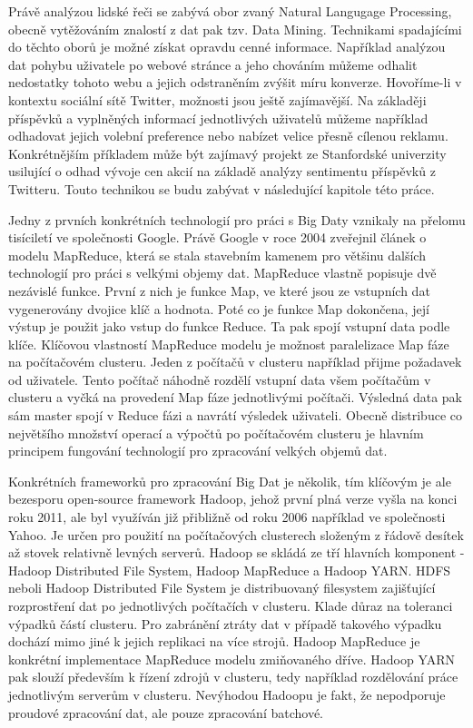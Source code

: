 \documentclass[thesis=B,czech]{FITthesis}[2012/06/26]
\begin{document}
 	Právě analýzou lidské řeči se zabývá obor zvaný Natural Langugage Processing, obecně vytěžováním znalostí z dat pak tzv. Data Mining. Technikami spadajícími do těchto oborů je možné získat opravdu cenné informace. Například analýzou dat pohybu uživatele po webové stránce a jeho chováním můžeme odhalit nedostatky tohoto webu a jejich odstraněním zvýšit míru konverze. Hovoříme-li v kontextu sociální sítě Twitter, možnosti jsou ještě zajímavější. Na základěji příspěvků a vyplněných informací jednotlivých uživatelů můžeme například odhadovat jejich volební preference nebo nabízet velice přesně cílenou reklamu. Konkrétnějším příkladem může být zajímavý projekt ze Stanfordské univerzity usilující o odhad vývoje cen akcií na základě analýzy sentimentu příspěvků z Twitteru\cite{stock-stanford}. Touto technikou se budu zabývat v následující kapitole této práce.  
	
	Jedny z prvních konkrétních technologií pro práci s Big Daty vznikaly na přelomu tisíciletí ve společnosti Google. Právě Google v roce 2004 zveřejnil článek o modelu MapReduce\cite{mapreduce-google}, která se stala stavebním kamenem pro většinu dalších technologií pro práci s velkými objemy dat. MapReduce vlastně popisuje dvě nezávislé funkce. První z nich je funkce Map, ve které jsou ze vstupních dat vygenerovány dvojice klíč a hodnota. Poté co je funkce Map dokončena, její výstup je použit jako vstup do funkce Reduce. Ta pak spojí vstupní data podle klíče\cite{mapreduce-description}. Klíčovou vlastností MapReduce modelu je možnost paralelizace Map fáze na počítačovém clusteru. Jeden z počítačů v clusteru například přijme požadavek od uživatele. Tento počítač náhodně rozdělí vstupní data všem počítačům v clusteru a vyčká na provedení Map fáze jednotlivými počítači. Výsledná data pak sám master spojí v Reduce fázi a navrátí výsledek uživateli. Obecně distribuce co největšího množství operací a výpočtů po počítačovém clusteru je hlavním principem fungování technologií pro zpracování velkých objemů dat. 
	
	Konkrétních frameworků pro zpracování Big Dat je několik, tím klíčovým je ale bezesporu open-source framework Hadoop, jehož první plná verze vyšla na konci roku 2011, ale byl využíván již přibližně od roku 2006 například ve společnosti Yahoo\cite{???}. Je určen pro použití na počítačových clusterech složeným z řádově desítek až stovek relativně levných serverů. Hadoop se skládá ze tří hlavních komponent - Hadoop Distributed File System, Hadoop MapReduce a Hadoop YARN. HDFS neboli Hadoop Distributed File System je distribuovaný filesystem zajišťující rozprostření dat po jednotlivých počítačích v clusteru. Klade důraz na toleranci výpadků částí clusteru. Pro zabránění ztráty dat v případě takového výpadku dochází mimo jiné k jejich replikaci na více strojů. Hadoop MapReduce je konkrétní implementace MapReduce modelu zmiňovaného dříve. Hadoop YARN pak slouží především k řízení zdrojů v clusteru, tedy například rozdělování práce jednotlivým serverům v clusteru. Nevýhodou Hadoopu je fakt, že nepodporuje proudové zpracování dat, ale pouze zpracování batchové. 
\end{document}
